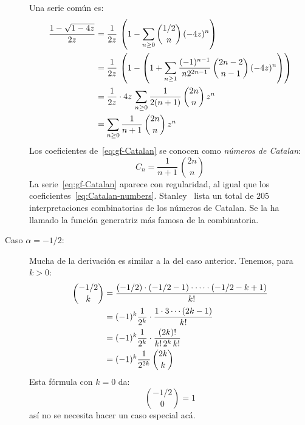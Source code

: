 \begin{description}
    Una serie común es:
    \begin{align}
      \frac{1 - \sqrt{1 - 4 z}}{2 z}
	&= \frac{1}{2 z} \,
	     \left(
	       1 - \sum_{n \ge 0} \binom{1 / 2}{n} \, (-4 z)^n
	     \right) \notag \\
	&= \frac{1}{2 z} \,
	     \left(
	       1 - \left(
		     1 + \sum_{n \ge 1}
			   \frac{(-1)^{n - 1}}{n 2^{2 n - 1}} \,
			     \binom{2 n - 2}{n - 1} \, (-4 z)^n
		   \right)
	     \right) \notag \\
	&= \frac{1}{2 z}
	     \cdot 4 z \, \sum_{n \ge 0}
			    \frac{1}{2 (n + 1)}
			       \, \binom{2 n}{n} \, z^n
		\notag \\
	&= \sum_{n \ge 0} \frac{1}{n + 1} \, \binom{2 n}{n} \, z^n
	     \label{eq:gf-Catalan}
	     \index{Catalan, numeros de@Catalan, números de!generatriz|textbfhy}
    \end{align}
    Los coeficientes de~\eqref{eq:gf-Catalan} se conocen como
    \emph{números de Catalan}:%
    \begin{equation}
      \label{eq:Catalan-numbers}
      C_n
	= \frac{1}{n + 1} \, \binom{2 n}{n}
    \end{equation}
    La serie~\eqref{eq:gf-Catalan} aparece con regularidad,
    al igual que los coeficientes~\eqref{eq:Catalan-numbers}.
    Stanley~%
      \cite{stanley99:_enumer_combin-2,
	    stanley13:_catalan_addendum}
    lista un total de \(205\) interpretaciones combinatorias
    de los números de Catalan.
    Se la ha llamado la función generatriz más famosa de la combinatoria.
  \item[\boldmath Caso \(\alpha = -1/2\):\unboldmath]
    Mucha de la derivación es similar a la del caso anterior.
    Tenemos,
    para \(k > 0\):
    \begin{align}
      \binom{-1/2}{k}
	&= \frac{(-1/2) \cdot (-1/2 - 1) \cdot \dotsm
		   \cdot (-1/2 - k + 1)}
		{k!} \notag \\
	&= (-1)^k \frac{1}{2^k}
	     \cdot \frac{1 \cdot 3 \dotsm (2 k - 1)}{k!} \notag \\
	&= (-1)^k \frac{1}{2^k}
	     \cdot \frac{(2 k)!}{k! \, 2^k \, k!} \notag \\
	&= (-1)^k \frac{1}{2^{2 k}} \, \binom{2 k}{k}
	    \label{eq:binomial(-1/2,k)}
    \end{align}
    Esta fórmula con \(k = 0\) da:
    \begin{equation*}
      \binom{-1/2}{0} = 1
    \end{equation*}
    así no se necesita hacer un caso especial acá.


\end{description}
